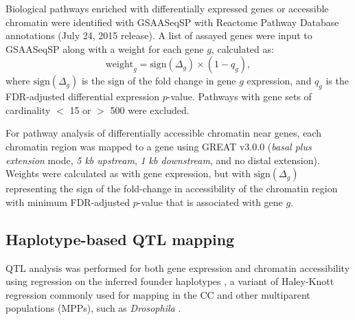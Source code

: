 \documentclass[10pt,letterpaper]{article}
\begin{document}
Biological pathways enriched with differentially expressed genes or accessible chromatin were identified with GSAASeqSP \cite{Xiong2014} with Reactome Pathway Database annotations (July 24, 2015 release). A list of assayed genes were input to GSAASeqSP along with a weight for each gene $g$, calculated as:
\begin{equation}
\text{weight}_{g} = \text{sign}(\Delta_{g}) \times (1-q_{g}),
\label{eq:gene_weighting}
\end{equation}
where $\text{sign}(\Delta_{g})$ is the sign of the fold change in gene $g$ expression, and $q_{g}$ is the FDR-adjusted differential expression $p$-value. Pathways with gene sets of cardinality $<$ 15 or $>$ 500 were excluded. 

For pathway analysis of differentially accessible chromatin near genes, each chromatin region was mapped to a gene using GREAT v3.0.0 (\textit{basal plus extension} mode, \textit{5 kb upstream}, \textit{1 kb downstream}, and no distal extension). 
Weights were calculated as with gene expression, but with $\text{sign}(\Delta_{g})$ representing the sign of the fold-change in accessibility of the chromatin region with minimum FDR-adjusted $p$-value that is associated with gene $g$.

\subsection*{Haplotype-based QTL mapping}

QTL analysis was performed for both gene expression and chromatin accessibility using regression on the inferred founder haplotypes \cite{Mott2000}, a variant of Haley-Knott regression \cite{Haley1992,Martinez1992} commonly used for mapping in the CC \cite{Valdar2006c,Aylor2011,Gralinski2015,Kelada2016,Donoghue2017,Keele2019} and other multiparent populations (MPPs), such as \textit{Drosophila} \cite{King2012}.
\end{document}
